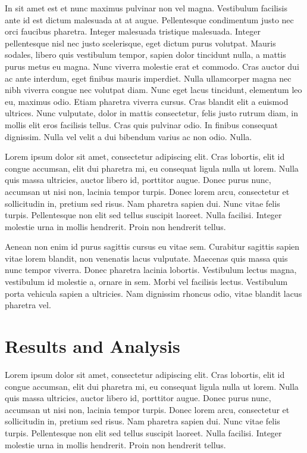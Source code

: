 \documentclass[a4paper]{article}
\begin{document}
In sit amet est et nunc maximus pulvinar non vel magna. Vestibulum facilisis ante id est dictum malesuada at at augue. Pellentesque condimentum justo nec orci faucibus pharetra. Integer malesuada tristique malesuada. Integer pellentesque nisl nec justo scelerisque, eget dictum purus volutpat. Mauris sodales, libero quis vestibulum tempor, sapien dolor tincidunt nulla, a mattis purus metus eu magna. Nunc viverra molestie erat et commodo. Cras auctor dui ac ante interdum, eget finibus mauris imperdiet. Nulla ullamcorper magna nec nibh viverra congue nec volutpat diam. Nunc eget lacus tincidunt, elementum leo eu, maximus odio. Etiam pharetra viverra cursus. Cras blandit elit a euismod ultrices. Nunc vulputate, dolor in mattis consectetur, felis justo rutrum diam, in mollis elit eros facilisis tellus. Cras quis pulvinar odio. In finibus consequat dignissim. Nulla vel velit a dui bibendum varius ac non odio. Nulla.

Lorem ipsum dolor sit amet, consectetur adipiscing elit. Cras lobortis, elit id congue accumsan, elit dui pharetra mi, eu consequat ligula nulla ut lorem. Nulla quis massa ultricies, auctor libero id, porttitor augue. Donec purus nunc, accumsan ut nisi non, lacinia tempor turpis. Donec lorem arcu, consectetur et sollicitudin in, pretium sed risus. Nam pharetra sapien dui. Nunc vitae felis turpis. Pellentesque non elit sed tellus suscipit laoreet. Nulla facilisi. Integer molestie urna in mollis hendrerit. Proin non hendrerit tellus.

Aenean non enim id purus sagittis cursus eu vitae sem. Curabitur sagittis sapien vitae lorem blandit, non venenatis lacus vulputate. Maecenas quis massa quis nunc tempor viverra. Donec pharetra lacinia lobortis. Vestibulum lectus magna, vestibulum id molestie a, ornare in sem. Morbi vel facilisis lectus. Vestibulum porta vehicula sapien a ultricies. Nam dignissim rhoncus odio, vitae blandit lacus pharetra vel.

\section{Results and Analysis}

%

Lorem ipsum dolor sit amet, consectetur adipiscing elit. Cras lobortis, elit id congue accumsan, elit dui pharetra mi, eu consequat ligula nulla ut lorem. Nulla quis massa ultricies, auctor libero id, porttitor augue. Donec purus nunc, accumsan ut nisi non, lacinia tempor turpis. Donec lorem arcu, consectetur et sollicitudin in, pretium sed risus. Nam pharetra sapien dui. Nunc vitae felis turpis. Pellentesque non elit sed tellus suscipit laoreet. Nulla facilisi. Integer molestie urna in mollis hendrerit. Proin non hendrerit tellus.
\end{document}
